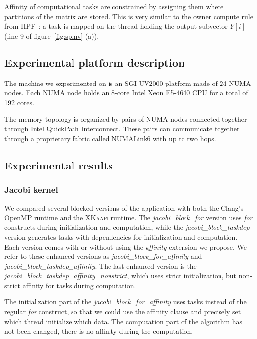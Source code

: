 \documentclass{Styles/llncs}
\newcommand{\kaapi}{\textsc{\mbox{XKaapi}}\xspace}
\begin{document}
Affinity of computational tasks are constrained by assigning them where partitions of the matrix are stored. This is very similar to the owner compute rule from HPF~\cite{HPF}: a task is mapped on the thread holding the output subvector $Y[i]$ (line 9 of figure~\ref{fig:spmv} (a)).

\subsection{Experimental platform description}
\label{sec:idchire}

The machine we experimented on is an SGI UV2000 platform made of 24 NUMA nodes.
Each NUMA node holds an 8-core Intel Xeon E5-4640 CPU for a total of 192 cores.

The memory topology is organized by pairs of NUMA nodes connected together through Intel QuickPath Interconnect.
These pairs can communicate together through a proprietary fabric called NUMALink6 with up to two hops.

\subsection{Experimental results}
\label{sec:experiment}

\subsubsection{Jacobi kernel}

We compared several blocked versions of the application with both the Clang's OpenMP runtime
and the \kaapi runtime. The \textit{jacobi\_block\_for} version uses \emph{for} constructs during initialization and computation, while the \textit{jacobi\_block\_taskdep} version generates tasks with dependencies for initialization and computation. Each version comes with or without using the \emph{affinity} extension we propose. We refer to these enhanced versions as \textit{jacobi\_block\_for\_affinity} and \textit{jacobi\_block\_taskdep\_affinity}. The last enhanced version is the
\textit{jacobi\_block\_taskdep\_affinity\_nonstrict}, which uses strict initialization, but non-strict affinity for tasks during computation.

The initialization part of the \textit{jacobi\_block\_for\_affinity} uses tasks
instead of the regular \emph{for} construct, so that we could use the affinity clause and precisely
set which thread initialize which data.
The computation part of the algorithm has not been changed, there is no affinity
during the computation.
\end{document}
